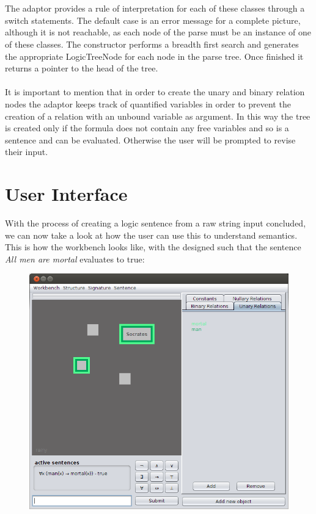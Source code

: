 \documentclass{report}
\begin{document}
\\ \\
The adaptor provides a rule of interpretation for each of these classes through 
a switch statements. The default case is an error message for a complete 
picture, although it is not reachable, as each node of the parse must be an 
instance of one of these classes. The constructor performs a breadth first 
search and generates the appropriate LogicTreeNode for each node in the parse 
tree. Once finished it returns a pointer to the head of the tree. 
\\ \\
It is important to mention that in order to create the unary and binary relation 
nodes the adaptor keeps track of quantified variables in order to prevent the 
creation of a relation with an unbound variable as argument. In this way the 
tree is created only if the formula does not contain any free variables and so 
is a sentence and can be evaluated. Otherwise the user will be prompted to 
revise their input.

\section{User Interface}
With the process of creating a logic sentence from a raw string input concluded, 
we can now take a look at how the user can use this to understand semantics. 
This is how the workbench looks like, with the designed such that the sentence 
\emph{All men are mortal} evaluates to true:
\begin{figure}[h!]
\centering \includegraphics[width=\textwidth]{workbench.png}
\end{figure}
\end{document}
